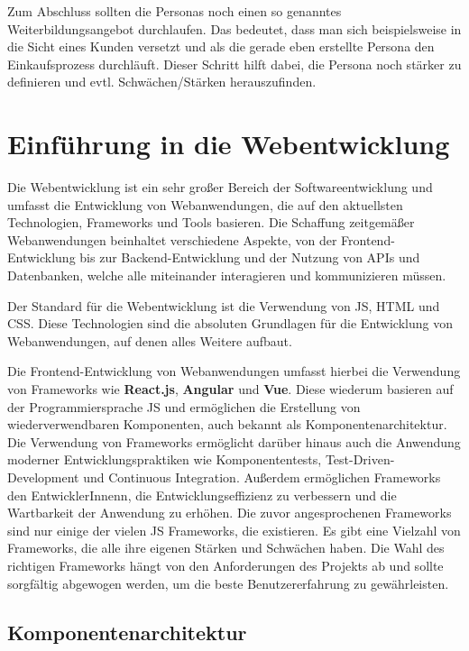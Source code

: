 Zum Abschluss sollten die Personas noch einen so genanntes Weiterbildungsangebot durchlaufen. Das bedeutet, dass man sich beispielsweise in die Sicht eines Kunden versetzt und als die gerade eben erstellte Persona den Einkaufsprozess durchläuft.\cite{personamethode} Dieser Schritt hilft dabei, die Persona noch stärker zu definieren und evtl. Schwächen/Stärken herauszufinden.

\section{Einführung in die Webentwicklung}

Die Webentwicklung ist ein sehr großer Bereich der Softwareentwicklung und umfasst die Entwicklung von Webanwendungen, die auf den aktuellsten Technologien, Frameworks und Tools basieren. Die Schaffung zeitgemäßer Webanwendungen beinhaltet verschiedene Aspekte, von der Frontend-Entwicklung bis zur Backend-Entwicklung und der Nutzung von \acf{API}s und Datenbanken, welche alle miteinander interagieren und kommunizieren müssen.

Der Standard für die Webentwicklung ist die Verwendung von \acf{JS}, \acf{HTML} und \acf{CSS}. Diese Technologien sind die absoluten Grundlagen für die Entwicklung von Webanwendungen, auf denen alles Weitere aufbaut.

Die Frontend-Entwicklung von Webanwendungen umfasst hierbei die Verwendung von Frameworks wie \textbf{React.js}, \textbf{Angular} und \textbf{Vue}. Diese wiederum basieren auf der Programmiersprache \acl{JS} und ermöglichen die Erstellung von wiederverwendbaren Komponenten, auch bekannt als Komponentenarchitektur. Die Verwendung von Frameworks ermöglicht darüber hinaus auch die Anwendung moderner Entwicklungspraktiken wie Komponententests, Test-Driven-Development und Continuous Integration. Außerdem ermöglichen Frameworks den EntwicklerInnenn, die Entwicklungseffizienz zu verbessern und die Wartbarkeit der Anwendung zu erhöhen. Die zuvor angesprochenen Frameworks sind nur einige der vielen \acl{JS} Frameworks, die existieren. Es gibt eine Vielzahl von Frameworks, die alle ihre eigenen Stärken und Schwächen haben. Die Wahl des richtigen Frameworks hängt von den Anforderungen des Projekts ab und sollte sorgfältig abgewogen werden, um die beste Benutzererfahrung zu gewährleisten.\cite{modern-webdevelopment:1, modern-webdevelopment:2}

\subsection{Komponentenarchitektur}

